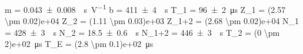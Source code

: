 m = \SI{0.043 \pm 0.008}{\per\second\per\volt}
b = \SI{411 \pm 4}{\per\second}
T_1 = \SI{96 \pm 2}{\micro\second}
Z_1 = \SI{(2.57 \pm 0.02)e+04}{}
Z_2 = \SI{(1.11 \pm 0.03)e+03}{}
Z_{1+2} = \SI{(2.68 \pm 0.02)e+04}{}
N_1 = \SI{428 \pm 3}{\per\second}
N_2 = \SI{18.5 \pm 0.6}{\per\second}
N_{1+2} = \SI{446 \pm 3}{\per\second}
T_2 = \SI{(0 \pm 2)e+02}{\micro\second}
T_E = \SI{(2.8 \pm 0.1)e+02}{\micro\second}
